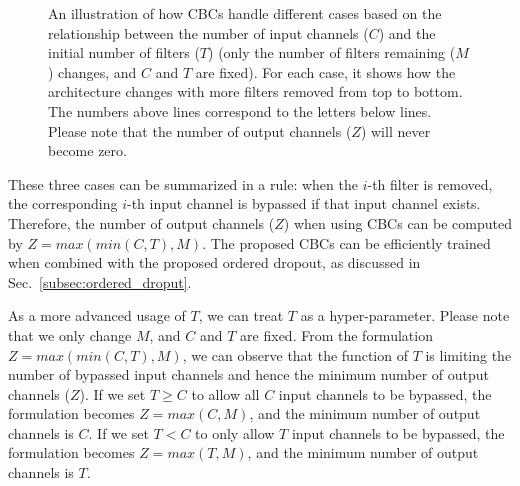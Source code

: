 \begin{figure*}[t]
    \centering
    \hfill
    \centering
    \hfill
    \centering
    \hfill
    \centering
    \caption{An illustration of how CBCs handle different cases based on the relationship between the number of input channels ($C$) and the initial number of filters ($T$) (only the number of filters remaining ($M$) changes, and $C$ and $T$ are fixed). For each case, it shows how the architecture changes with more filters removed from top to bottom. The numbers above lines correspond to the letters below lines. Please note that the number of output channels ($Z$) will never become zero.}
    \label{fig:cbc}
\end{figure*}

These three cases can be summarized in a rule: when the $i$-th filter is removed, the corresponding $i$-th input channel is bypassed if that input channel exists. Therefore, the number of output channels ($Z$) when using CBCs can be computed by $Z = max(min(C, T), M)$. The proposed CBCs can be efficiently trained when combined with the proposed ordered dropout, as discussed in Sec.~\ref{subsec:ordered_droput}.

As a more advanced usage of $T$, we can treat $T$ as a hyper-parameter. Please note that we only change $M$, and $C$ and $T$ are fixed. From the formulation $Z = max(min(C, T), M)$, we can observe that the function of $T$ is limiting the number of bypassed input channels and hence the minimum number of output channels ($Z$). If we set $T \geq C$ to allow all $C$ input channels to be bypassed, the formulation becomes $Z = max(C, M)$, and the minimum number of output channels is $C$. If we set $T < C$ to only allow $T$ input channels to be bypassed, the formulation becomes $Z = max(T, M)$, and the minimum number of output channels is $T$. 

